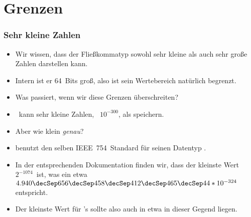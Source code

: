 \documentclass[aspectratio=169,mathserif,notheorems]{beamer}%
\begin{document}
\section{Grenzen}%
%
\begin{frame}%
\frametitle{Sehr kleine Zahlen}%
\begin{itemize}%
\item Wir wissen, dass der Fließkommatyp  sowohl sehr kleine als auch sehr große Zahlen darstellen kann.%
\item<2-> Intern ist er 64~Bits groß, also ist sein Wertebereich natürlich begrenzt.%
\item<3-> Was passiert, wenn wir diese Grenzen überschreiten?%
\item<4-> \python\ kann sehr kleine Zahlen, \DEzB~$10^{-300}$, als  speichern.%
\item<5-> Aber wie klein \emph{genau}?%
\item<6->  benutzt den selben IEEE~754~Standard\cite{IEEE2019ISFFPA} für seinen Datentyp .%
\item<7-> In der entsprechenden Dokumentation\cite{O2024JPSEJDKV2AS:CD} finden wir, dass der kleinste Wert $2^{-1074}$~ist, was ein etwa~$4.940\decSep656\decSep458\decSep412\decSep465\decSep44*10^{-324}$ entspricht.%
\item<8-> Der kleinste Wert für \python's  sollte also auch in etwa in dieser Gegend liegen.%
\end{itemize}%
\end{frame}%
%
\end{document}
